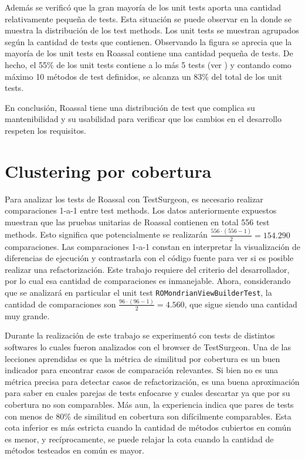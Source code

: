 \par Además se verificó que la gran mayoría de los unit tests aporta una cantidad relativamente pequeña de tests. Esta situación se puede observar en la  donde se muestra la distribución de los test methods. Los unit tests se muestran agrupados según la cantidad de tests que contienen. Observando la figura se aprecia que la mayoría de los unit tests en Roassal contiene una cantidad pequeña de tests. De hecho, el 55\% de los unit tests contiene a lo más 5 tests (ver ) y contando como máximo 10 métodos de test definidos, se alcanza un 83\% del total de los unit tests. 


\par En conclusión, Roassal tiene una distribución de test que complica su mantenibilidad y su usabilidad para verificar que los cambios en el desarrollo respeten los requisitos. 


\section{Clustering por cobertura}

\par Para analizar los tests de Roassal con TestSurgeon, es necesario realizar comparaciones 1-a-1 entre test methods. Los datos anteriormente expuestos muestran que las pruebas unitarias de Roassal contienen en total 556 test methods. Esto significa que potencialmente se realizarán $\frac{556 \cdot \left(556 -1 \right)}{2} = 154.290$ comparaciones. Las comparaciones 1-a-1 constan en interpretar la visualización de diferencias de ejecución y contrastarla con el código fuente para ver si es posible realizar una refactorización. Este trabajo requiere del criterio del desarrollador, por lo cual esa cantidad de comparaciones es inmanejable. Ahora, considerando que se analizará en particular el unit test {\tt ROMondrianViewBuilderTest}, la cantidad de comparaciones son $\frac{96 \cdot \left(96 -1 \right)}{2} = 4.560$, que sigue siendo una cantidad muy grande.

\par Durante la realización de este trabajo se experimentó con tests de distintos softwares lo cuales fueron analizados con el browser de TestSurgeon. Una de las lecciones aprendidas es que la métrica de similitud por cobertura es un buen indicador para encontrar casos de comparación relevantes. Si bien no es una métrica precisa para detectar casos de refactorización, es una buena aproximación para saber en cuales parejas de tests enfocarse y cuales descartar ya que por su cobertura no son comparables. Más aun, la experiencia indica que pares de tests con menos de 80\% de similitud en cobertura son difícilmente comparables. Esta cota inferior es más estricta cuando la cantidad de métodos cubiertos en común es menor, y recíprocamente, se puede relajar la cota cuando la cantidad de métodos testeados en común es mayor. 

